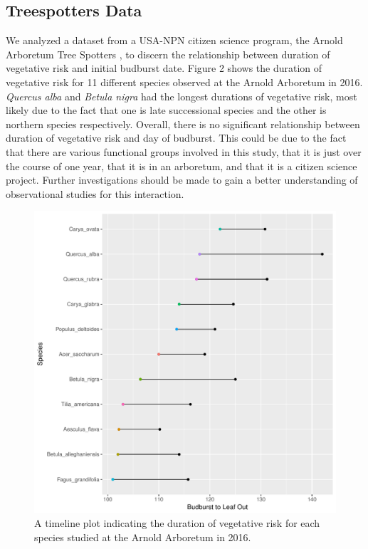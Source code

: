 \documentclass{article}\usepackage[]{graphicx}\usepackage[]{color}
\makeatletter
\def\maxwidth{ %
  \ifdim\Gin@nat@width>\linewidth
    \linewidth
  \else
    \Gin@nat@width
  \fi
}
\makeatother
\begin{document}
\subsection*{Treespotters Data}
We analyzed a dataset from a USA-NPN citizen science program, the Arnold Arboretum Tree Spotters %
, to discern the relationship between duration of vegetative risk and initial budburst date. Figure 2 shows the duration of vegetative risk for 11 different species observed at the Arnold Arboretum in 2016. \textit{Quercus alba} and \textit{Betula nigra} had the longest durations of vegetative risk, most likely due to the fact that one is late successional species and the other is northern species respectively. Overall, there is no significant relationship between duration of vegetative risk and day of budburst. This could be due to the fact that there are various functional groups involved in this study, that it is just over the course of one year, that it is in an arboretum, and that it is a citizen science project. Further investigations should be made to gain a better understanding of observational studies for this interaction. 



\begin{figure}[H]
\includegraphics[width=\maxwidth]{figure/treespotters-1} \caption[A timeline plot indicating the duration of vegetative risk for each species studied at the Arnold Arboretum in 2016]{A timeline plot indicating the duration of vegetative risk for each species studied at the Arnold Arboretum in 2016.}\label{fig:treespotters}
\end{figure}
\end{document}
